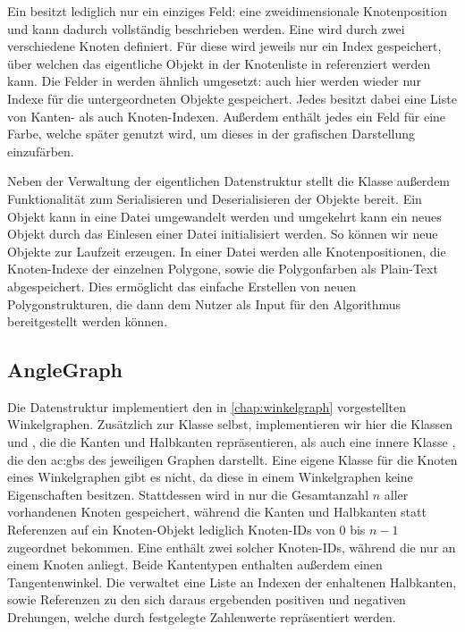 Ein  besitzt lediglich nur ein einziges Feld: eine zweidimensionale Knotenposition und kann dadurch vollständig
beschrieben werden. Eine  wird durch zwei verschiedene Knoten definiert. Für diese wird jeweils nur ein Index gespeichert,
über welchen das eigentliche  Objekt in der Knotenliste in  referenziert werden kann. Die Felder in
 werden ähnlich umgesetzt: auch hier werden wieder nur Indexe für die untergeordneten Objekte gespeichert. Jedes
 besitzt dabei eine Liste von Kanten- als auch Knoten-Indexen. Außerdem enthält jedes  ein Feld
für eine Farbe, welche später genutzt wird, um dieses in der grafischen Darstellung einzufärben.

Neben der Verwaltung der eigentlichen Datenstruktur stellt die  Klasse außerdem Funktionalität zum Serialisieren
und Deserialisieren der Objekte bereit. Ein  Objekt kann in eine  Datei umgewandelt werden und umgekehrt
kann ein neues  Objekt durch das Einlesen einer  Datei initialisiert werden. So können wir neue
 Objekte zur Laufzeit erzeugen. In einer  Datei werden alle Knotenpositionen, die Knoten-Indexe der einzelnen
Polygone, sowie die Polygonfarben als Plain-Text abgespeichert. Dies ermöglicht das einfache Erstellen von neuen Polygonstrukturen, die
dann dem Nutzer als Input für den Algorithmus bereitgestellt werden können.

\subsection{AngleGraph}
Die  Datenstruktur implementiert den in \autoref{chap:winkelgraph} vorgestellten Winkelgraphen. Zusätzlich zur
 Klasse selbst, implementieren wir hier die Klassen  und , die die Kanten
und Halbkanten repräsentieren, als auch eine innere Klasse , die den \gls{ac:gbs} des jeweiligen Graphen
darstellt. Eine eigene Klasse für die Knoten eines Winkelgraphen gibt es nicht, da diese in einem Winkelgraphen keine Eigenschaften
besitzen. Stattdessen wird in  nur die Gesamtanzahl \(n\) aller vorhandenen Knoten gespeichert, während die Kanten
und Halbkanten statt Referenzen auf ein Knoten-Objekt lediglich Knoten-IDs von \(0\) bis \(n - 1\) zugeordnet bekommen.
Eine  enthält zwei solcher Knoten-IDs, während die  nur an einem Knoten anliegt. Beide Kantentypen
enthalten außerdem einen Tangentenwinkel. Die  verwaltet eine Liste an Indexen der enhaltenen Halbkanten, sowie
Referenzen zu den sich daraus ergebenden positiven und negativen Drehungen, welche durch festgelegte Zahlenwerte repräsentiert werden.

